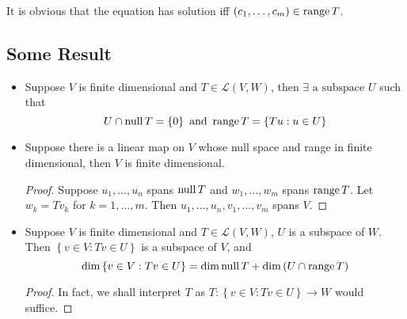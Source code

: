 \documentclass[../main.tex]{subfiles}
\begin{document}
It is obvious that the equation has solution iff $(c_1, \ldots ,c_m) \in \operatorname{range} T$.
\subsection{Some Result}

\begin{itemize}
\item Suppose $V$ is finite dimensional and $T\in \mathscr{L}(V,W)$, then $\exists \text{ a subspace }U$ such that
	\begin{equation*}
	U\cap \operatorname{null} T = \left\{ 0 \right\} \text{   and   }\operatorname{range} T = \left\{ Tu:u\in U \right\}
	\end{equation*}

\item Suppose there is a linear map on $V$ whose null space and range in finite dimensional, then $V$ is finite dimensional.
	\begin{proof}
	Suppose $u_1, \ldots ,u_n$ spans $\operatorname{null} T$ and $w_1, \ldots ,w_m$ spans $\operatorname{range} T$. Let $w_k = Tv_k$ for $k=1, \ldots ,m$. Then $u_1, \ldots ,u_n, v_1, \ldots ,v_m$ spans $V$.
	\end{proof}

\item Suppose $V$ is finite dimensional and $T\in \mathscr{L}(V,W)$, $U$ is a subspace of $W$. Then $\left\{ v\in V: Tv \in U \right\}$ is a subspace of $V$, and 
	\begin{equation}
	\dim \left\{ v\in V: Tv\in U \right\} = \dim\operatorname{null} T + \dim \left(U\cap\operatorname{range} T\right)
	\end{equation}

	\begin{proof}
	In fact, we shall interpret $T$ as $T: \left\{ v\in V: Tv\in U \right\} \rightarrow  W$ would suffice.
	\end{proof}


\end{itemize}
\end{document}
